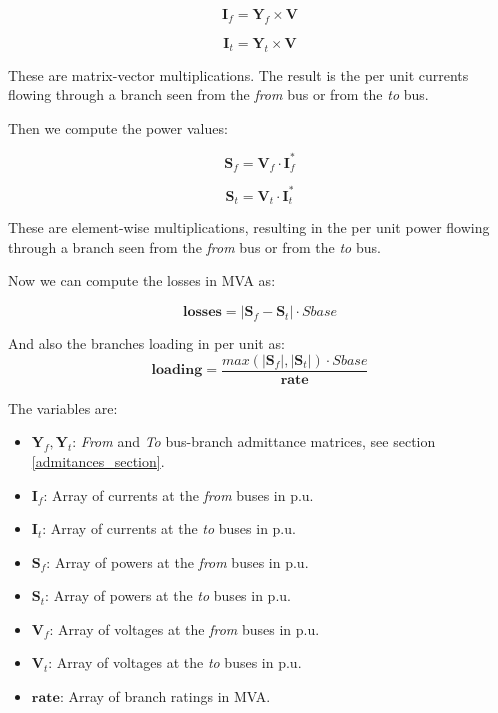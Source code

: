\documentclass[11pt,fleqn]{book} %
\begin{document}
\begin{equation}
{\textbf{I}_f = \textbf{Y}_f \times \textbf{V}}
\end{equation}

\begin{equation}
{\textbf{I}_t = \textbf{Y}_t \times \textbf{V}}
\end{equation}


These are matrix-vector multiplications. The result is the per unit currents flowing through a branch seen from the \textit{from} bus or from the \textit{to} bus.


Then we compute the power values:

\begin{equation}
{\textbf{S}_f = \textbf{V}_f \cdot \textbf{I}_f^*}
\end{equation}

\begin{equation}
{\textbf{S}_t = \textbf{V}_t \cdot \textbf{I}_t^*}
\end{equation}

These are element-wise multiplications, resulting in the per unit power flowing through a branch seen from the \textit{from} bus or from the \textit{to} bus.

Now we can compute the losses in MVA as:

\begin{equation}
{\textbf{losses} = |\textbf{S}_f - \textbf{S}_t| \cdot Sbase}
\end{equation}

And also the branches loading in per unit as:
\begin{equation}
{\textbf{loading} = \frac{max(|\textbf{S}_f|, |\textbf{S}_t|) \cdot Sbase}{ \textbf{rate}}}
\end{equation}

The variables are:

\begin{itemize}
	\item $\textbf{Y}_f, \textbf{Y}_t$: \textit{From} and \textit{To} bus-branch admittance matrices, see section \ref{admitances_section}.
	\item $\textbf{I}_f$: Array of currents at the \textit{from} buses in p.u.
	\item $\textbf{I}_t$: Array of currents at the \textit{to} buses in p.u.
	\item $\textbf{S}_f$: Array of powers at the \textit{from} buses in p.u.
	\item $\textbf{S}_t$: Array of powers at the \textit{to} buses in p.u.
	\item $\textbf{V}_f$: Array of voltages at the \textit{from} buses in p.u.
	\item $\textbf{V}_t$: Array of voltages at the \textit{to} buses in p.u.
	\item $\textbf{rate}$: Array of branch ratings in MVA.
\end{itemize}
\end{document}
